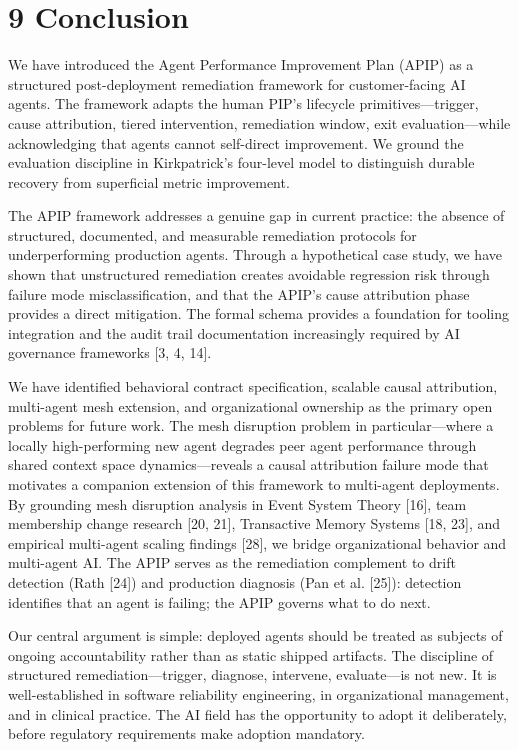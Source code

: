 \section{9  Conclusion}

We have introduced the Agent Performance Improvement Plan (APIP) as a structured post-deployment remediation framework for customer-facing AI agents. The framework adapts the human PIP's lifecycle primitives---trigger, cause attribution, tiered intervention, remediation window, exit evaluation---while acknowledging that agents cannot self-direct improvement. We ground the evaluation discipline in Kirkpatrick's four-level model to distinguish durable recovery from superficial metric improvement.

The APIP framework addresses a genuine gap in current practice: the absence of structured, documented, and measurable remediation protocols for underperforming production agents. Through a hypothetical case study, we have shown that unstructured remediation creates avoidable regression risk through failure mode misclassification, and that the APIP's cause attribution phase provides a direct mitigation. The formal schema provides a foundation for tooling integration and the audit trail documentation increasingly required by AI governance frameworks [3, 4, 14].

We have identified behavioral contract specification, scalable causal attribution, multi-agent mesh extension, and organizational ownership as the primary open problems for future work. The mesh disruption problem in particular---where a locally high-performing new agent degrades peer agent performance through shared context space dynamics---reveals a causal attribution failure mode that motivates a companion extension of this framework to multi-agent deployments. By grounding mesh disruption analysis in Event System Theory [16], team membership change research [20, 21], Transactive Memory Systems [18, 23], and empirical multi-agent scaling findings [28], we bridge organizational behavior and multi-agent AI. The APIP serves as the remediation complement to drift detection (Rath [24]) and production diagnosis (Pan et al. [25]): detection identifies that an agent is failing; the APIP governs what to do next.

Our central argument is simple: deployed agents should be treated as subjects of ongoing accountability rather than as static shipped artifacts. The discipline of structured remediation---trigger, diagnose, intervene, evaluate---is not new. It is well-established in software reliability engineering, in organizational management, and in clinical practice. The AI field has the opportunity to adopt it deliberately, before regulatory requirements make adoption mandatory.

